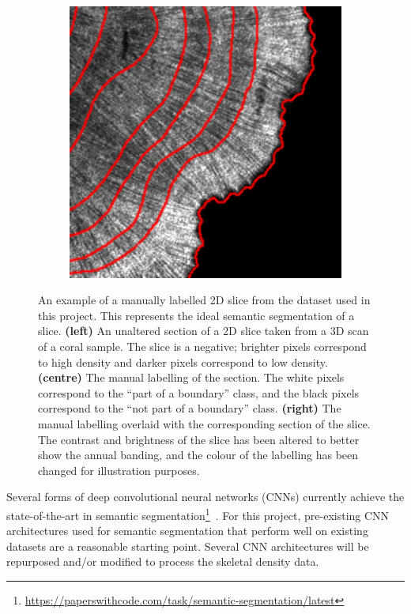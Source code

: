 \begin{figure}[t]
\begin{subfigure}[t]{0.32\textwidth}
    \end{subfigure}
    ~
    \begin{subfigure}[t]{0.32\textwidth}
        \centering
        \includegraphics[width=1\textwidth, valign=c]{images/label-example-3.png}
    \end{subfigure}
    \caption{An example of a manually labelled 2D slice from the dataset used in this project. This represents the ideal semantic segmentation of a slice. \textbf{(left)} An unaltered section of a 2D slice taken from a 3D scan of a coral sample. The slice is a negative; brighter pixels correspond to high density and darker pixels correspond to low density. \textbf{(centre)} The manual labelling of the section. The white pixels correspond to the ``part of a boundary'' class, and the black pixels correspond to the ``not part of a boundary'' class. \textbf{(right)} The manual labelling overlaid with the corresponding section of the slice. The contrast and brightness of the slice has been altered to better show the annual banding, and the colour of the labelling has been changed for illustration purposes.}
    \label{fig:example-label}
\end{figure}

Several forms of deep convolutional neural networks (CNNs) currently achieve the state-of-the-art in semantic segmentation\footnote{\url{https://paperswithcode.com/task/semantic-segmentation/latest}}~\cite{chen2018encoder, semanticseg-SOTA}. For this project, pre-existing CNN architectures used for semantic segmentation that perform well on existing datasets are a reasonable starting point. Several CNN architectures will be repurposed and/or modified to process the skeletal density data.

